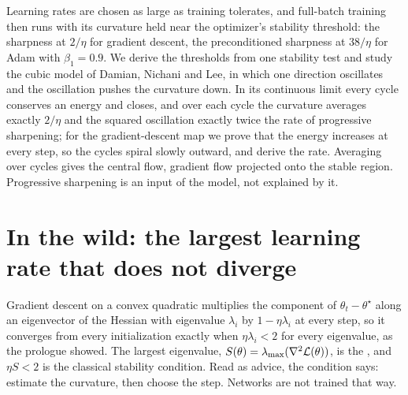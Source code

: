 \newcommand{\eosHmin}{\cH_{\min}}
\newcommand{\eosArea}{\mathcal{J}}

\begin{refsection}

\begin{chaptersummary}
Learning rates are chosen as large as training tolerates, and full-batch training then runs with its curvature held near the optimizer's stability threshold: the sharpness at $2/\eta$ for gradient descent, the preconditioned sharpness at $38/\eta$ for Adam with $\beta_1=0.9$. We derive the thresholds from one stability test and study the cubic model of Damian, Nichani and Lee, in which one direction oscillates and the oscillation pushes the curvature down. In its continuous limit every cycle conserves an energy and closes, and over each cycle the curvature averages exactly $2/\eta$ and the squared oscillation exactly twice the rate of progressive sharpening; for the gradient-descent map we prove that the energy increases at every step, so the cycles spiral slowly outward, and derive the rate. Averaging over cycles gives the central flow, gradient flow projected onto the stable region. Progressive sharpening is an input of the model, not explained by it.
\end{chaptersummary}

\section{In the wild: the largest learning rate that does not diverge}\label{sec:eos:wild}

Gradient descent on a convex quadratic multiplies the component of $\theta_t-\theta^\star$ along an eigenvector of the Hessian with eigenvalue $\lambda_i$ by $1-\eta\lambda_i$ at every step, so it converges from every initialization exactly when $\eta\lambda_i<2$ for every eigenvalue, as the prologue showed. The largest eigenvalue, $S(\theta)=\lambda_{\max}(\nabla^2\mathcal{L}(\theta))$, is the , and $\eta S<2$ is the classical stability condition. Read as advice, the condition says: estimate the curvature, then choose the step. Networks are not trained that way.


\end{refsection}
